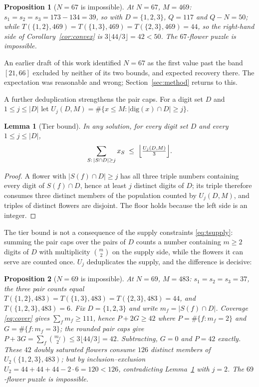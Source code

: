 \documentclass[11pt]{article}
\newtheorem{lemma}{Lemma}
\newtheorem{proposition}{Proposition}
\theoremstyle{definition}
\theoremstyle{remark}
\begin{document}
\begin{proposition}[$N=67$ is impossible]\label{prop:67}
At $N=67$, $M=469$: $s_1=s_2=s_3=173-134=39$, so with $D=\{1,2,3\}$, $Q=117$ and $Q-N=50$; while $T(\{1,2\},469)=T(\{1,3\},469)=T(\{2,3\},469)=44$, so the right-hand side of Corollary~\ref{cor:convex} is $3\lfloor 44/3\rfloor = 42 < 50$. The $67$-flower puzzle is impossible.
\end{proposition}

An earlier draft of this work identified $N=67$ as the first value past the band $[21,66]$ excluded by neither of its two bounds, and expected recovery there. The expectation was reasonable and wrong; Section~\ref{sec:method} returns to this.

A further deduplication strengthens the pair caps. For a digit set $D$ and $1\le j\le |D|$ let
$U_j(D,M)=\#\{x\le M: |\mathrm{dig}(x)\cap D|\ge j\}$.

\begin{lemma}[Tier bound]\label{lem:tier}
In any solution, for every digit set $D$ and every $1\le j\le |D|$,
\[
\sum_{S:\,|S\cap D|\ge j} x_S \;\le\; \Bigl\lfloor \tfrac{U_j(D,M)}{3}\Bigr\rfloor .
\]
\end{lemma}

\begin{proof}
A flower with $|S(f)\cap D|\ge j$ has all three triple numbers containing every digit of
$S(f)\cap D$, hence at least $j$ distinct digits of $D$; its triple therefore consumes three
distinct members of the population counted by $U_j(D,M)$, and triples of distinct flowers are
disjoint. The floor holds because the left side is an integer.
\end{proof}

The tier bound is not a consequence of the supply constraints \eqref{eq:tsupply}: summing the
pair caps over the pairs of $D$ counts a number containing $m\ge 2$ digits of $D$ with
multiplicity $\binom{m}{2}$ on the supply side, while the flowers it can serve are counted once.
$U_j$ deduplicates the supply, and the difference is decisive:

\begin{proposition}[$N=69$ is impossible]\label{prop:69}
At $N=69$, $M=483$: $s_1=s_2=s_3=37$, the three pair counts equal
$T(\{1,2\},483)=T(\{1,3\},483)=T(\{2,3\},483)=44$, and $T(\{1,2,3\},483)=6$. Fix
$D=\{1,2,3\}$ and write $m_f=|S(f)\cap D|$. Coverage \eqref{eq:cover} gives
$\sum_f m_f\ge 111$, hence $P+2G\ge 42$ where $P=\#\{f:m_f=2\}$ and $G=\#\{f:m_f=3\}$; the
rounded pair caps give $P+3G=\sum_f\binom{m_f}{2}\le 3\lfloor 44/3\rfloor=42$. Subtracting,
$G=0$ and $P=42$ exactly. These $42$ doubly saturated flowers consume $126$ distinct members
of $U_2(\{1,2,3\},483)$; but by inclusion--exclusion
$U_2 = 44+44+44-2\cdot 6 = 120 < 126$, contradicting Lemma~\ref{lem:tier} with $j=2$. The
$69$-flower puzzle is impossible.
\end{proposition}
\end{document}
